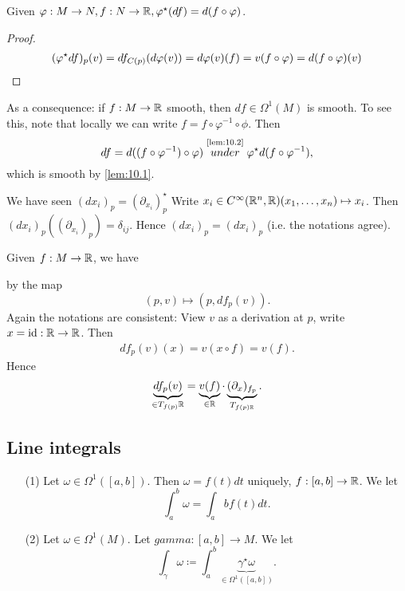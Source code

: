 \begin{lemma}\label{lem:10.2}
    Given \(\varphi:M\to N,f:N\to \mathbb{R},\varphi^\star(df)=d(f\circ \varphi)\).
\end{lemma}

\begin{proof}
    \begin{align*}
        (\varphi^\star df)_p(v)=df_{C(p)}(d\varphi(v))=d\varphi(v)(f)=v(f\circ \varphi)=d(f\circ \varphi)(v) \qedhere
    \end{align*}
\end{proof}
 
As a consequence: if \(f:M\to \mathbb{R}\) smooth, then \(df\in \Omega^1(M)\) is smooth. To see this, note that 
locally we can write \(f=f\circ \varphi^{-1}\circ \phi\). Then \[df=d((f\circ \varphi^{-1})\circ \varphi)\stackrel{\text{\ref{lem:10.2}}}{under}\varphi^\star d(f\circ \varphi^{-1}),\]
which is smooth by \ref{lem:10.1}.

\begin{remark}
    We have seen \((dx_i)_p=(\partial_{x_i})_p^\star\)
    Write \(x_i\in C^\infty(\mathbb{R}^n,\mathbb{R})(x_1,\dots,x_n)\mapsto x_i\).
    Then \((dx_i)_p((\partial_{x_i})_p)=\delta_{ij}\). Hence \((dx_i)_p=(dx_i)_p\) (i.e. the notations agree). 
\end{remark}

\begin{remark}
    Given \(f:M\to \mathbb{R}\), we have 
    by the map \[(p,v)\mapsto (p,df_p(v)).\]
    Again the notations are consistent: View \(v\) as a derivation at \(p\),
    write \(x=\text{id}:\mathbb{R}\to\mathbb{R}\). Then 
    \begin{align*}
        df_p(v)(x)=v(x\circ f)=v(f).
    \end{align*}
    Hence \[\underbrace{df_p(v)}_{\in T_{f(p)}\mathbb{R}}=\underbrace{v(f)}_{\in\mathbb{R}}\cdot \underbrace{(\partial_x)_{f_p}}_{T_{f(p)\mathbb{R}}}.\] %
\end{remark}

\subsection{Line integrals}

\begin{definition*}
    \begin{enumerate}
        \item[(1)] Let \(\omega\in \Omega^1([a,b])\). Then \(\omega=f(t)dt\) uniquely, \(f:[a,b]\to\mathbb{R}\).
                   We let \[\int_a^b\omega=\int_a b f(t)dt.\] 
        \item[(2)] Let \(\omega\in \Omega^1(M)\). Let \(gamma:[a,b]\to M\). We let \[\int_\gamma \omega\coloneqq \int_a^b\underbrace{\gamma^\star \omega}_{\in\Omega^1([a,b])}.\]
    \end{enumerate}
\end{definition*}

